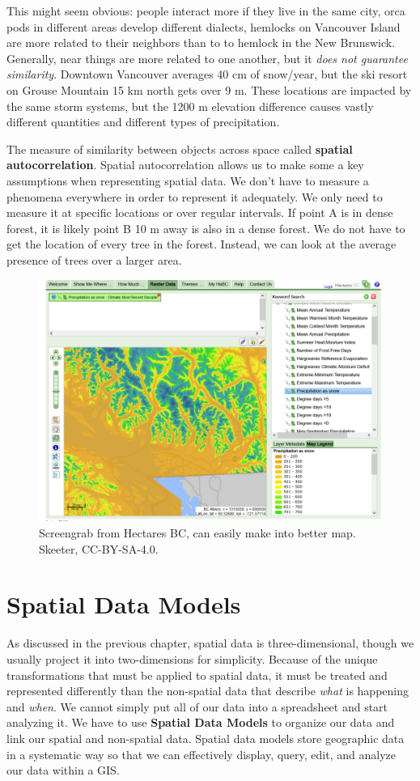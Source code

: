 \documentclass[
]{book}
\begin{document}
This might seem obvious: people interact more if they live in the same city, orca pods in different areas develop different dialects, hemlocks on Vancouver Island are more related to their neighbors than to to hemlock in the New Brunswick. Generally, near things are more related to one another, but it \emph{does not guarantee similarity}. Downtown Vancouver averages 40 cm of snow/year, but the ski resort on Grouse Mountain 15 km north gets over 9 m. These locations are impacted by the same storm systems, but the 1200 m elevation difference causes vastly different quantities and different types of precipitation.

The measure of similarity between objects across space called \textbf{spatial autocorrelation}. Spatial autocorrelation allows us to make some a key assumptions when representing spatial data. We don't have to measure a phenomena everywhere in order to represent it adequately. We only need to measure it at specific locations or over regular intervals. If point A is in dense forest, it is likely point B 10 m away is also in a dense forest. We do not have to get the location of every tree in the forest. Instead, we can look at the average presence of trees over a larger area.

\begin{figure}
\includegraphics[width=0.75\linewidth]{images/03-bc-snow} \caption{Screengrab from Hectares BC, can easily make into better map. Skeeter, CC-BY-SA-4.0.}\label{fig:3-bc-snow}
\end{figure}

\section{Spatial Data Models}\label{spatial-data-models}

As discussed in the previous chapter, spatial data is three-dimensional, though we usually project it into two-dimensions for simplicity. Because of the unique transformations that must be applied to spatial data, it must be treated and represented differently than the non-spatial data that describe \emph{what} is happening and \emph{when}. We cannot simply put all of our data into a spreadsheet and start analyzing it. We have to use \textbf{Spatial Data Models} to organize our data and link our spatial and non-spatial data. Spatial data models store geographic data in a systematic way so that we can effectively display, query, edit, and analyze our data within a GIS.
\end{document}
